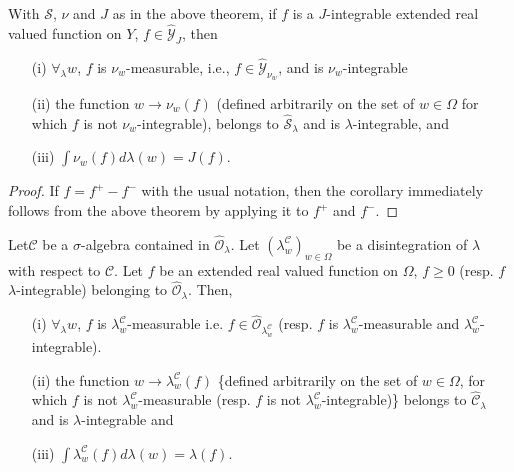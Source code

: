 \begin{corollary}[Fubini]\label{part1:chap2:coro16}
With $\mathcal{S}$, $\nu$ and $J$ as in the above theorem, if $f$ is a
$J$-integrable extended real valued function on $Y$, $f \in
\hat{\mathscr{Y}}_J$, then 
\begin{itemize}
\item[{\rm (i)}] $\forall_\lambda w$, $f$ is $\nu_w$-measurable,
  i.e., $f \in\hat{\mathscr{Y}}_{\nu_w}$, and is $\nu_w$-integrable 

\item[{\rm (ii)}] the function $w \to \nu_w (f)$ (defined arbitrarily
  on the set of $w \in \Omega$ for which $f$ is not
  $\nu_w$-integrable), belongs to $\hat{\mathcal{S}}_\lambda$ and is
  $\lambda$-integrable, and 

\item[{\rm (iii)}] \qquad $\int \nu_w (f) d\lambda(w) = J(f)$. 
\end{itemize}
\end{corollary}

\begin{proof}
If $f = f^+ - f^-$ with the usual notation, then the corollary
immediately follows from the above theorem by applying it to $f^+$ and
$f^-$. 
\end{proof}

\begin{corollary}\label{part1:chap2:coro17}
Let\pageoriginale $\mathscr{C}$ be a $\sigma$-algebra contained in
$\hat{\mathscr{O}}_\lambda$. Let $(\lambda^\mathscr{C}_w)_{w \in
  \Omega}$ be a disintegration of $\lambda$ with respect to
$\mathscr{C}$. Let $f$ be an extended real valued function on
$\Omega$, $f \geq 0$ (resp. $f$ $\lambda$-integrable) belonging to
$\hat{\mathscr{O}}_\lambda$. Then,
\begin{itemize}  
\item[{\rm (i)}] $\forall_\lambda w$, $f$ is
  $\lambda^\mathscr{C}_w$-measurable i.e. $f \in
  \hat{\mathscr{O}}_{\lambda^\mathscr{C}_w} $ (resp. $f$ is
  $\lambda^\mathscr{C}_w$-measurable and
  $\lambda^\mathscr{C}_w$-integrable). 

\item[{\rm (ii)}] the function $w \to \lambda^\mathscr{C}_w (f)$
  \{defined  arbitrarily on the set of $w \in \Omega$, for which $f$
  is not $\lambda^\mathscr{C}_w$-measurable (resp. $f$ is not
  $\lambda^\mathscr{C}_w$-integrable)\} belongs to
  $\hat{\mathscr{C}}_\lambda$ and is $\lambda$-integrable and 

\item[{\rm (iii)}] \qquad $\int \lambda^\mathscr{C}_w (f) d \lambda
  (w) = \lambda (f)$. 

\end{itemize}
\end{corollary}

